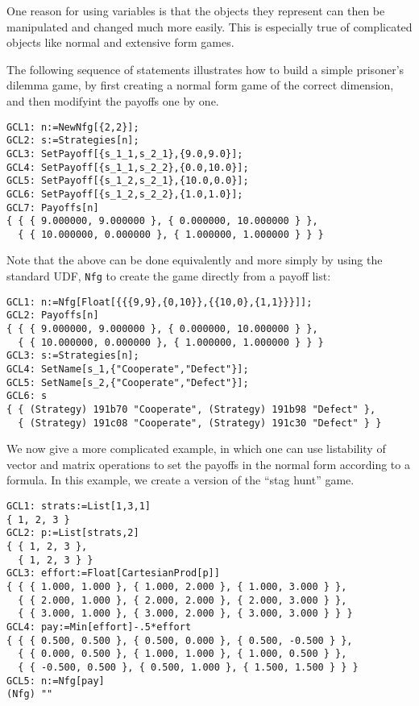 One reason for using variables is that the objects they represent can
then be manipulated and changed much more easily.  This is especially
true of complicated objects like normal and extensive form games.  

The following sequence of statements illustrates how to build a simple
prisoner's dilemma game, by first creating a normal form game of the
correct dimension, and then modifyint the payoffs one by one.

\begin{verbatim}
GCL1: n:=NewNfg[{2,2}];
GCL2: s:=Strategies[n];
GCL3: SetPayoff[{s_1_1,s_2_1},{9.0,9.0}];
GCL4: SetPayoff[{s_1_1,s_2_2},{0.0,10.0}];
GCL5: SetPayoff[{s_1_2,s_2_1},{10.0,0.0}];
GCL6: SetPayoff[{s_1_2,s_2_2},{1.0,1.0}];
GCL7: Payoffs[n]
{ { { 9.000000, 9.000000 }, { 0.000000, 10.000000 } },
  { { 10.000000, 0.000000 }, { 1.000000, 1.000000 } } }
\end{verbatim}

Note that the above can be done equivalently and more simply by using
the standard UDF, \verb+Nfg+ to create the game directly from a payoff
list:

\begin{verbatim}
GCL1: n:=Nfg[Float[{{{9,9},{0,10}},{{10,0},{1,1}}}]];
GCL2: Payoffs[n]
{ { { 9.000000, 9.000000 }, { 0.000000, 10.000000 } },
  { { 10.000000, 0.000000 }, { 1.000000, 1.000000 } } }
GCL3: s:=Strategies[n];
GCL4: SetName[s_1,{"Cooperate","Defect"}];
GCL5: SetName[s_2,{"Cooperate","Defect"}];  
GCL6: s
{ { (Strategy) 191b70 "Cooperate", (Strategy) 191b98 "Defect" },
  { (Strategy) 191c08 "Cooperate", (Strategy) 191c30 "Defect" } }
\end{verbatim}

We now give a more complicated example, in which one can use
listability of vector and matrix operations to set the payoffs in the
normal form according to a formula.  In this example, we create a
version of the ``stag hunt'' game.

\begin{verbatim}
GCL1: strats:=List[1,3,1]
{ 1, 2, 3 }
GCL2: p:=List[strats,2]
{ { 1, 2, 3 },
  { 1, 2, 3 } }
GCL3: effort:=Float[CartesianProd[p]] 
{ { { 1.000, 1.000 }, { 1.000, 2.000 }, { 1.000, 3.000 } },
  { { 2.000, 1.000 }, { 2.000, 2.000 }, { 2.000, 3.000 } },
  { { 3.000, 1.000 }, { 3.000, 2.000 }, { 3.000, 3.000 } } }
GCL4: pay:=Min[effort]-.5*effort
{ { { 0.500, 0.500 }, { 0.500, 0.000 }, { 0.500, -0.500 } },
  { { 0.000, 0.500 }, { 1.000, 1.000 }, { 1.000, 0.500 } },
  { { -0.500, 0.500 }, { 0.500, 1.000 }, { 1.500, 1.500 } } }
GCL5: n:=Nfg[pay]
(Nfg) ""
\end{verbatim}


